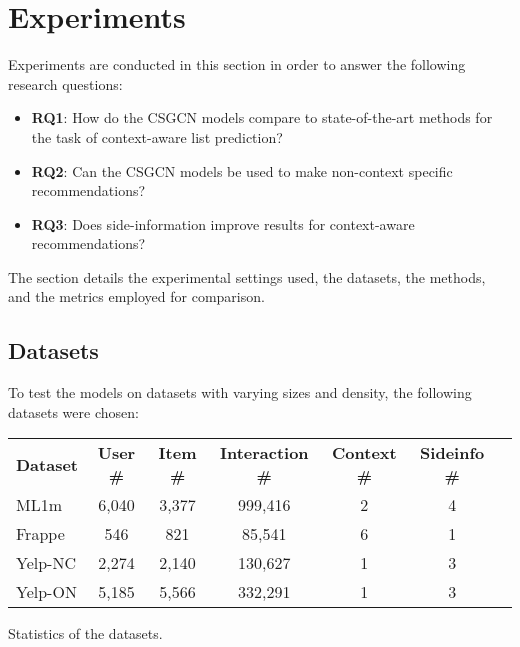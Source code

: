 \section{Experiments}\label{sec:experiments}
Experiments are conducted in this section in order to answer the following research questions:
\begin{itemize}
    \item \textbf{RQ1}: How do the CSGCN models compare to state-of-the-art methods for the task of context-aware list prediction?
    \item \textbf{RQ2}: Can the CSGCN models be used to make non-context specific recommendations?
    \item \textbf{RQ3}: Does side-information improve results for context-aware recommendations?
\end{itemize}
The section details the experimental settings used, the datasets, the methods, and the metrics employed for comparison.

\subsection{Datasets}\label{subsec:experimental-settings}
To test the models on datasets with varying sizes and density, the following datasets were chosen:\\

\begin{adjustwidth}{-2.5 cm}{-2.5 cm}\centering
\begin{threeparttable}[]
\scriptsize
\begin{tabular}{lcccccc}\toprule
\textbf{Dataset} &\textbf{User \#} &\textbf{Item \#} &\textbf{Interaction \#} &\textbf{Context \#} &\textbf{Sideinfo \#} \\\cmidrule{1-6}
ML1m &6,040 &3,377 &999,416 &2 &4 \\\cmidrule{1-6}
Frappe &546 & 821 &85,541 &6 &1 \\\cmidrule{1-6}
Yelp-NC &2,274 &2,140 &130,627 &1 &3 \\\cmidrule{1-6}
Yelp-ON &5,185 &5,566 &332,291 &1 &3 \\\midrule
\bottomrule
\end{tabular}
\caption{Statistics of the datasets.}\label{tab:datasetstats}
\end{threeparttable}
\end{adjustwidth}

